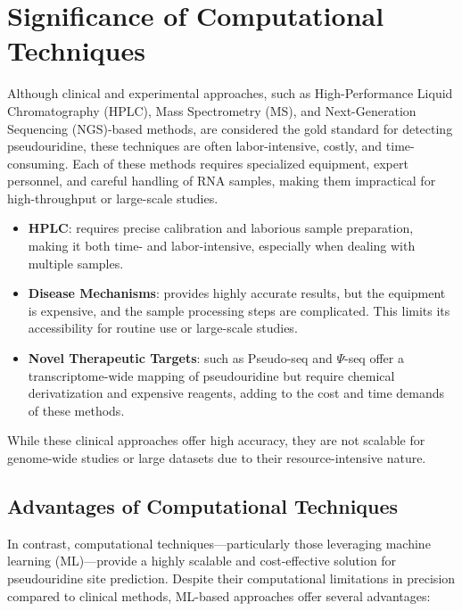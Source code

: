 \section{Significance of Computational Techniques}
  Although clinical and experimental approaches, such as High-Performance Liquid Chromatography (HPLC), Mass Spectrometry (MS), and Next-Generation Sequencing (NGS)-based methods, are considered the gold standard for detecting pseudouridine, these techniques are often labor-intensive, costly, and time-consuming. Each of these methods requires specialized equipment, expert personnel, and careful handling of RNA samples, making them impractical for high-throughput or large-scale studies.

  \begin{itemize}
    \item \textbf{HPLC}: requires precise calibration and laborious sample preparation, making it both time- and labor-intensive, especially when dealing with multiple samples.
    \item \textbf{Disease Mechanisms}: provides highly accurate results, but the equipment is expensive, and the sample processing steps are complicated. This limits its accessibility for routine use or large-scale studies.
    \item \textbf{Novel Therapeutic Targets}: such as Pseudo-seq and $\Psi$-seq offer a transcriptome-wide mapping of pseudouridine but require chemical derivatization and expensive reagents, adding to the cost and time demands of these methods.
  \end{itemize}

  While these clinical approaches offer high accuracy, they are not scalable for genome-wide studies or large datasets due to their resource-intensive nature.

  \subsection*{Advantages of Computational Techniques}
    In contrast, computational techniques—particularly those leveraging machine learning (ML)—provide a highly scalable and cost-effective solution for pseudouridine site prediction. Despite their computational limitations in precision compared to clinical methods, ML-based approaches offer several advantages:

